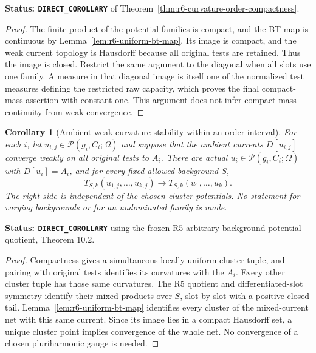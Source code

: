\documentclass[11pt,a4paper]{article}
\numberwithin{equation}{section}
\newtheorem{corollary}[theorem]{Corollary}
\theoremstyle{definition}
\theoremstyle{remark}
\begin{document}
\noindent\textbf{Status: \texttt{DIRECT\_COROLLARY}} of
Theorem~\ref{thm:r6-curvature-order-compactness}.

\begin{proof}
The finite product of the potential families is compact, and the
BT map is continuous by Lemma~\ref{lem:r6-uniform-bt-map}. Its
image is compact, and the weak current topology is Hausdorff because
all original tests are retained. Thus the image is closed. Restrict
the same argument to the diagonal when all slots use one family.
A measure in that diagonal image is itself one of the normalized
test measures defining the restricted raw capacity, which proves
the final compact-mass assertion with constant one. This argument
does not infer compact-mass continuity from weak convergence.
\end{proof}

\begin{corollary}[Ambient weak curvature stability within an order interval]
\label{cor:r6-order-interval-quotient-stability}
For each $i$, let $u_{i,j}\in\mathscr P(g_i,C_i;\Omega)$ and
suppose that the ambient currents $D[u_{i,j}]$ converge weakly on
all original tests to $A_i$. There are actual
$u_i\in\mathscr P(g_i,C_i;\Omega)$ with $D[u_i]=A_i$, and for
every fixed allowed background $S$,
\[
       T_{S,k}(u_{1,j},\ldots,u_{k,j})
                       \longrightarrow T_{S,k}(u_1,\ldots,u_k).
\]
The right side is independent of the chosen cluster potentials.
No statement for varying backgrounds or for an undominated family
is made.
\end{corollary}

\noindent\textbf{Status: \texttt{DIRECT\_COROLLARY}} using the
frozen R5 arbitrary-background potential quotient, Theorem 10.2.

\begin{proof}
Compactness gives a simultaneous locally uniform cluster tuple,
and pairing with original tests identifies its curvatures with
the $A_i$. Every other cluster tuple has those same curvatures.
The R5 quotient and differentiated-slot symmetry identify their
mixed products over $S$, slot by slot with a positive closed tail.
Lemma~\ref{lem:r6-uniform-bt-map} identifies every cluster of the
mixed-current net with this same current. Since its image lies in
a compact Hausdorff set, a unique cluster point implies convergence
of the whole net. No convergence of a chosen pluriharmonic gauge is
needed.
\end{proof}
\end{document}
